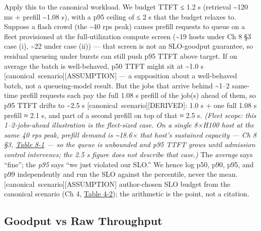 Apply this to the canonical workload. We budget TTFT ≤ 1.2 s (retrieval
\textasciitilde120 ms + prefill \textasciitilde1.08 s), with a p95
ceiling of ≤ 2 s that the budget relaxes to. Suppose a flash crowd (the
\textasciitilde40 rps peak) causes prefill requests to queue on a fleet
provisioned at the full-utilization compute screen (\textasciitilde19
hosts under Ch 8 §3 case (i), \textasciitilde22 under case (ii)) ---
that screen is not an SLO-goodput guarantee, so residual queueing under
bursts can still push p95 TTFT above target. If on average the batch is
well-behaved, p50 TTFT might sit at \textasciitilde1.0 s \mbox{{[}canonical
scenario{]}}\hspace{0pt}\mbox{{[}ASSUMPTION{]}} --- a supposition about a well-behaved
batch, not a queueing-model result. But the jobs that arrive behind
\textasciitilde1--2 same-time prefill requests each pay the full 1.08 s
prefill of the job(s) ahead of them, so p95 TTFT drifts to
\textasciitilde2.5 s \mbox{{[}canonical scenario{]}}\hspace{0pt}\mbox{{[}DERIVED{]}}: 1.0 s + one
full 1.08 s prefill ≈ 2.1 s, and part of a second prefill on top of that
≈ 2.5 s. \emph{(Fleet scope: this 1--2-jobs-ahead illustration is the
fleet-sized case. On a single 8×H100 host at the same 40 rps peak,
prefill demand is \textasciitilde18.6× that host's sustained capacity
--- Ch 8 §3, \hyperref[tab:8.1]{Table 8-1} --- so the queue is unbounded and p95 TTFT grows
until admission control intervenes; the 2.5 s figure does not describe
that case.)} The \emph{average} says ``fine''; the \emph{p95} says ``we
just violated our SLO.'' We hence log p50, p90, p95, and p99
independently and run the SLO against the percentile, never the mean.
\mbox{{[}canonical scenario{]}}\hspace{0pt}\mbox{{[}ASSUMPTION{]}} author-chosen SLO budget from
the canonical scenario (Ch 4, \hyperref[tab:4.2]{Table 4-2}); the arithmetic is the point,
not a citation.

\subsection{Goodput vs Raw Throughput}\label{goodput-vs-raw-throughput}


